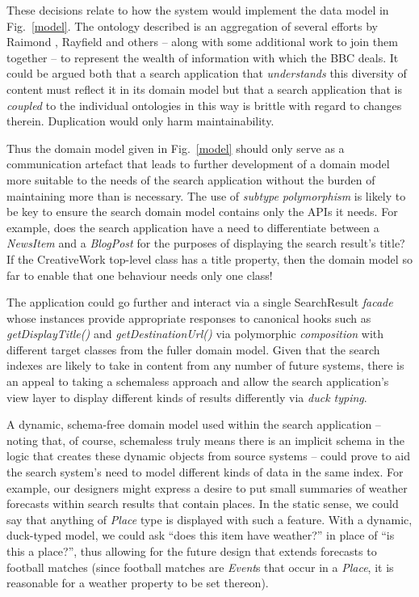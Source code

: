 \documentclass[oribibl]{llncs}
\begin{document}
These decisions relate to how the system would implement the data model
in Fig.~\ref{model}. The ontology described is an aggregation
of several efforts by Raimond \citep{raimond2009bbc}, Rayfield
\citep{rayfield2011bbc} and others -- along with some additional work
to join them together -- to represent the wealth of
information with which the BBC deals. It could be argued both that
a search application that \emph{understands} this diversity of
content must reflect it in its domain model but that a search
application that is \emph{coupled} to the individual ontologies
in this way is brittle with regard to changes therein. Duplication
would only harm maintainability.

Thus the domain model given in Fig.~\ref{model} should only serve
as a communication artefact that leads to further development of
a domain model more suitable to the needs of the search application
without the burden of maintaining more than is necessary. The use
of \emph{subtype polymorphism} \citep{booch2007object} is likely
to be key to ensure the search domain model contains only the APIs
it needs. For example, does the search application have a need
to differentiate between a \emph{NewsItem} and a \emph{BlogPost}
for the purposes of displaying the search result's title? If the
CreativeWork top-level class has a title property, then the domain
model so far to enable that one behaviour needs only one class!

The application could go further and interact via a single
SearchResult \emph{facade} \citep{fowler2002patterns} whose
instances provide appropriate responses to canonical hooks
such as \emph{getDisplayTitle()} and \emph{getDestinationUrl()}
via polymorphic \emph{composition} with different target classes
from the fuller domain model. Given that the search indexes
are likely to take in content from any number of future systems,
there is an appeal to taking a schemaless approach \citep{sadalage2012nosql}
and allow the search application's view layer to display
different kinds of results differently via \emph{duck typing}.
\citep{python2013ducktyping}

A dynamic, schema-free domain model used within the search application
-- noting that, of course, schemaless truly means there is an
implicit schema in the logic that creates these dynamic objects from
source systems \citep{sadalage2012nosql} -- could prove to aid the
search system's need to model different kinds of data in the same
index. For example, our designers might express a desire to put
small summaries of weather forecasts within search results that
contain places. In the static sense, we could say that anything
of \emph{Place} type is displayed with such a feature. With
a dynamic, duck-typed model, we could ask
``does this item have weather?'' in place of ``is this a place?'', thus
allowing for the future design that extends forecasts to football
matches (since football matches are \emph{Event}s that occur in
a \emph{Place}, it is reasonable for a weather property to be
set thereon).
\end{document}
